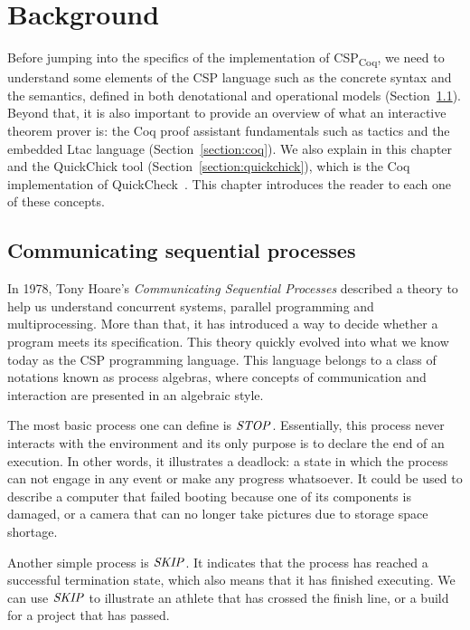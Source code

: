 \chapter{Background}
\label{chapter:background}

Before jumping into the specifics of the implementation of CSP\textsubscript{Coq}, we need to understand some elements of the CSP language such as the concrete syntax and the semantics, defined in both denotational and operational models (Section~\ref{section:csp}). Beyond that, it is also important to provide an overview of what an interactive theorem prover is: the Coq proof assistant fundamentals such as tactics and the embedded Ltac language (Section~\ref{section:coq}). We also explain in this chapter and the QuickChick tool (Section~\ref{section:quickchick}), which is the Coq implementation of QuickCheck~\cite{hughes:quickcheck2000}. This chapter introduces the reader to each one of these concepts.

\section{Communicating sequential processes}
\label{section:csp}

In 1978, Tony Hoare's \emph{Communicating Sequential Processes} described a theory to help us understand concurrent systems, parallel programming and multiprocessing. More than that, it has introduced a way to decide whether a program meets its specification. This theory quickly evolved into what we know today as the CSP programming language. This language belongs to a class of notations known as process algebras, where concepts of communication and interaction are presented in an algebraic style.


The most basic process one can define is $ \mathit{\mathord{{STOP}}} $. Essentially, this process never interacts with the environment and its only purpose is to declare the end of an execution. In other words, it illustrates a deadlock: a state in which the process can not engage in any event or make any progress whatsoever. It could be used to describe a computer that failed booting because one of its components is damaged, or a camera that can no longer take pictures due to storage space shortage.

Another simple process is $ \mathit{\mathord{{SKIP}}} $. It indicates that the process has reached a successful termination state, which also means that it has finished executing. We can use $ \mathit{\mathord{{SKIP}}} $ to illustrate an athlete that has crossed the finish line, or a build for a project that has passed.

